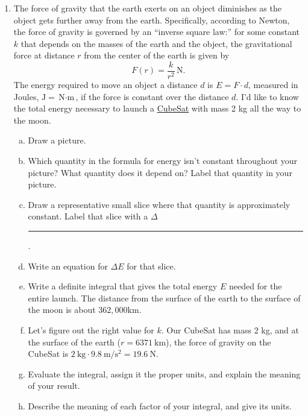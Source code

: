 \documentclass[12pt]{article}
\begin{document}
\begin{enumerate}
\item The force of gravity that the earth exerts on an object diminishes as the object gets further away from the earth. Specifically, according to Newton, the force of gravity is governed by an ``inverse square law:'' for some constant \(k\) that depends on the masses of the earth and the object, the gravitational force at distance \(r\) from the center of the earth is given by 
\[ F(r) = \frac{k}{r^2}\, \unit{\N}.\]
The energy required to move an object a distance \(d\) is \(E = F\cdot d\), measured in Joules, \(\unit{\J} = \unit{\N \cdot \m}\), if the force is constant over the distance \(d\).  I'd like to know the total energy necessary to launch a \href{https://en.wikipedia.org/wiki/CubeSat}{CubeSat} with mass 2 kg all the way to the moon.
\begin{enumerate}[(a)]
    \item Draw a picture.
    \item Which quantity in the formula for energy isn't constant throughout your picture? What quantity does it depend on? Label that quantity in your picture.
    \item Draw a representative small slice where that quantity is approximately constant. Label that slice with a \(\Delta\)\rule{0.5cm}{0.15mm}.
    \item Write an equation for \(\Delta E\) for that slice.
    \item Write a definite integral that gives the total energy \(E\) needed for the entire launch. The distance from the surface of the earth to the surface of the moon is about \(362{,}000\unit{\km}\).
    \item Let's figure out the right value for \(k\). Our CubeSat has mass 2 kg, and at the surface of the earth (\(r = \qty{6371}{\km}\)), the force of gravity on the CubeSat is \(\qty{2}{\kg}\cdot\qty{9.8}{\m/\s^2} = \qty{19.6}{\N}\).
    \item Evaluate the integral, assign it the proper units, and explain the meaning of your result.
    \item Describe the meaning of each factor of your integral, and give its units.
\end{enumerate}


\end{enumerate}
\end{document}
